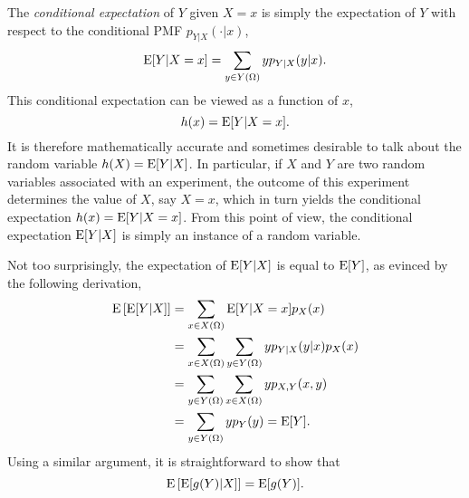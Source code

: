 The \emph{conditional expectation} of $Y$ given $X = x$ is simply the expectation of $Y$ with respect to the conditional PMF $p_{Y|X} (\cdot | x)$, 
\begin{equation*}
\mathrm{E} [Y | X = x ] = \sum_{y \in Y(\Omega)} y p_{Y|X} (y|x).
\end{equation*}
This conditional expectation can be viewed as a function of $x$,
\begin{equation*}
h(x) = \mathrm{E} [Y | X = x] .
\end{equation*}
It is therefore mathematically accurate and sometimes desirable to talk about the random variable $h (X) = \mathrm{E} [Y | X]$.
In particular, if $X$ and $Y$ are two random variables associated with an experiment, the outcome of this experiment determines the value of $X$, say $X = x$, which in turn yields the conditional expectation $h(x) = \mathrm{E} [Y | X = x]$.
From this point of view, the conditional expectation $\mathrm{E} [Y | X]$ is simply an instance of a random variable.

Not too surprisingly, the expectation of $\mathrm{E} [Y | X]$ is equal to $\mathrm{E} [Y]$, as evinced by the following derivation,
\begin{equation*}
\begin{split}
\mathrm{E} \left[ \mathrm{E} [Y | X] \right]
&= \sum_{x \in X(\Omega)} \mathrm{E} [Y | X = x] p_X (x) \\
&= \sum_{x \in X(\Omega)} \sum_{y \in Y(\Omega)} y p_{Y|X} (y|x) p_X (x) \\
&= \sum_{y \in Y(\Omega)} \sum_{x \in X(\Omega)} y p_{X,Y} (x, y) \\
&= \sum_{y \in Y(\Omega)} y p_{Y} (y)
= \mathrm{E} [Y] .
\end{split}
\end{equation*}
Using a similar argument, it is straightforward to show that
\begin{equation*}
\mathrm{E} \left[ \mathrm{E} [g (Y) | X] \right] = \mathrm{E} [g(Y)] .
\end{equation*}

